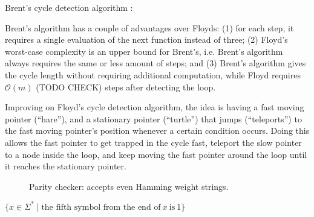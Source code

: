 \documentclass{article}
\theoremstyle{definition}
\begin{document}
Brent's cycle detection algorithm \cite{Brent80}:

Brent's algorithm has a couple of advantages over Floyds: (1) for each step, it requires a
single evaluation of the next function instead of three; (2) Floyd's worst-case
complexity is an upper bound for Brent's, i.e. Brent's algorithm always requires the
same or less amount of steps; and (3) Brent's algorithm gives the cycle length
without requiring additional computation, while Floyd requires $\mathcal{O}(m)$
(TODO CHECK)
steps after detecting the loop. 

Improving on Floyd's cycle detection algorithm, the idea is having a fast
moving pointer (``hare''), and a stationary pointer (``turtle'') that jumps
(``teleports'') to the fast moving pointer's position whenever a certain
condition occurs. Doing this allows the fast pointer to get trapped in the cycle
fast, teleport the slow pointer to a node inside the loop, and keep moving the
fast pointer around the loop until it reaches the stationary pointer. 

\begin{figure}[ht] %
\centering %
\caption{Parity checker: accepts even Hamming weight strings.}
\label{fig:my_label}
\end{figure}

$\{x \in \Sigma^* \mid \text{the fifth symbol from the end of}~x~\text{is}~1 \} $

\begin{figure}[ht] %
\centering %
\caption{}
\label{fig:my_label}
\end{figure}
\end{document}
